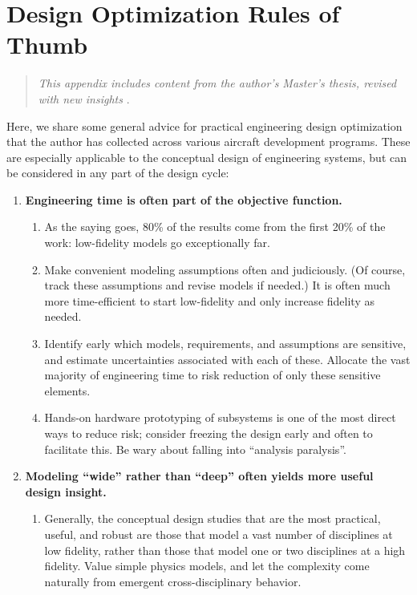 \chapter{Design Optimization Rules of Thumb}

\begin{quote}
    \emph{This appendix includes content from the author's Master's thesis, revised with new insights} \cite{sharpe_aerosandbox_2021}.
\end{quote}

Here, we share some general advice for practical engineering design optimization that the author has collected across various aircraft development programs. These are especially applicable to the conceptual design of engineering systems, but can be considered in any part of the design cycle:

\begin{enumerate}
    \item \textbf{Engineering time is often part of the objective function.}
    \begin{enumerate}
        \item As the saying goes, 80\% of the results come from the first 20\% of the work: low-fidelity models go exceptionally far.
        \item Make convenient modeling assumptions often and judiciously. (Of course, track these assumptions and revise models if needed.) It is often much more time-efficient to start low-fidelity and only increase fidelity as needed.
        \item Identify early which models, requirements, and assumptions are sensitive, and estimate uncertainties associated with each of these. Allocate the vast majority of engineering time to risk reduction of only these sensitive elements.
        \item Hands-on hardware prototyping of subsystems is one of the most direct ways to reduce risk; consider freezing the design early and often to facilitate this. Be wary about falling into ``analysis paralysis''.
    \end{enumerate}
    \item \textbf{Modeling ``wide'' rather than ``deep'' often yields more useful design insight.}
    \begin{enumerate}
        \item Generally, the conceptual design studies that are the most practical, useful, and robust are those that model a vast number of disciplines at low fidelity, rather than those that model one or two disciplines at a high fidelity. Value simple physics models, and let the complexity come naturally from emergent cross-disciplinary behavior.

\end{enumerate}
\end{enumerate}
